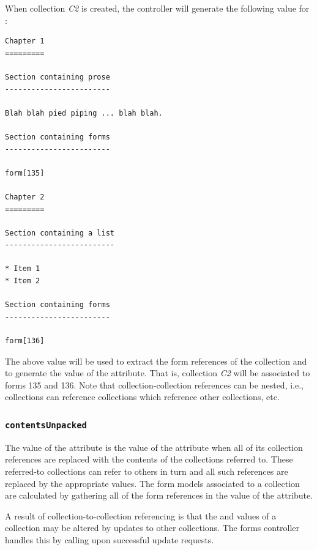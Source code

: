 \documentclass[letterpaper,10pt,english]{sphinxmanual}
\begin{document}
When collection \emph{C2} is created, the  controller will generate
the following value for :

\begin{Verbatim}[commandchars=\\\{\}]
Chapter 1
=========

Section containing prose
------------------------

Blah blah pied piping ... blah blah.

Section containing forms
------------------------

form[135]

Chapter 2
=========

Section containing a list
-------------------------

* Item 1
* Item 2

Section containing forms
------------------------

form[136]
\end{Verbatim}

The above  value will be used to extract the form references
of the collection and to generate the value of the  attribute.  That is,
collection \emph{C2} will be associated to forms 135 and 136.  Note that
collection-collection references can be nested, i.e., collections can reference
collections which reference other collections, etc.


\subsubsection{\texttt{contentsUnpacked}}
\label{datastructure:contentsunpacked}
The value of the  attribute is the value of the 
attribute when all of its collection references are replaced with the contents
of the collections referred to.  These referred-to collections can refer to
others in turn and all such references are replaced by the appropriate
 values.  The form models associated to a collection are calculated
by gathering all of the form references in the value of the 
attribute.

A result of collection-to-collection referencing is that the  and
 values of a collection may be altered by updates to other collections.
The forms controller handles this by calling
 upon successful update
requests.
\end{document}
